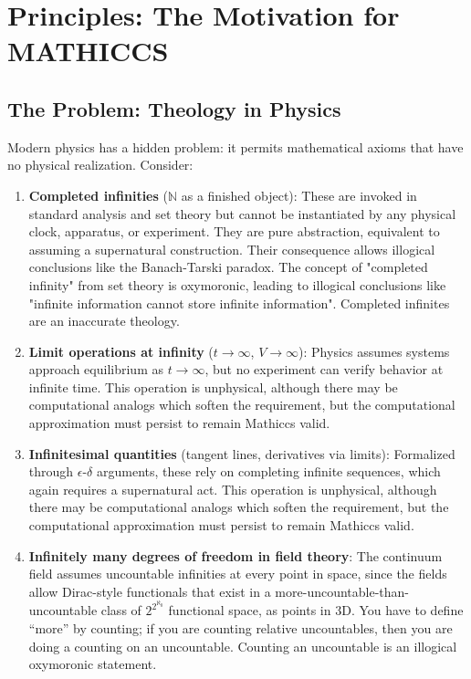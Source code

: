 \documentclass[11pt,a4paper]{article}
\begin{document}

\section{Principles: The Motivation for MATHICCS}

  \subsection{The Problem: Theology in Physics}

  Modern physics has a hidden problem: it permits mathematical axioms that have no physical realization. Consider:

  \begin{enumerate}
  \item \textbf{Completed infinities} ($\mathbb{N}$ as a finished object):
   These are invoked in standard analysis and set theory but cannot be instantiated by any physical clock, apparatus, or experiment. They are pure abstraction, equivalent to assuming a supernatural construction. Their consequence allows illogical conclusions like the Banach-Tarski paradox. The concept of "completed infinity" from set theory is oxymoronic, leading to illogical conclusions like "infinite information cannot store infinite information". Completed infinites are an inaccurate theology.

  \item \textbf{Limit operations at infinity} ($t \to \infty$, $V \to \infty$): Physics assumes systems approach equilibrium as $t \to \infty$, but no experiment can verify behavior at infinite time. This operation is unphysical, although there may be computational analogs which soften the requirement, but the computational approximation must persist to remain Mathiccs valid.

  \item \textbf{Infinitesimal quantities} (tangent lines, derivatives via limits): Formalized through $\epsilon$-$\delta$ arguments, these rely on completing infinite sequences, which again requires a supernatural act.  This operation is unphysical, although there may be computational analogs which soften the requirement, but the computational approximation must persist to remain Mathiccs valid.


  \item \textbf{Infinitely many degrees of freedom in field theory}: The continuum field assumes uncountable infinities at every point in space, since the fields allow Dirac-style functionals that exist in a more-uncountable-than-uncountable class of $2^{2^{\aleph_0}}$ functional space, as points in 3D. You have to define ``more'' by counting; if you are counting relative uncountables, then you are doing a counting on an uncountable. Counting an uncountable is an illogical oxymoronic statement.


\end{enumerate}
\end{document}

